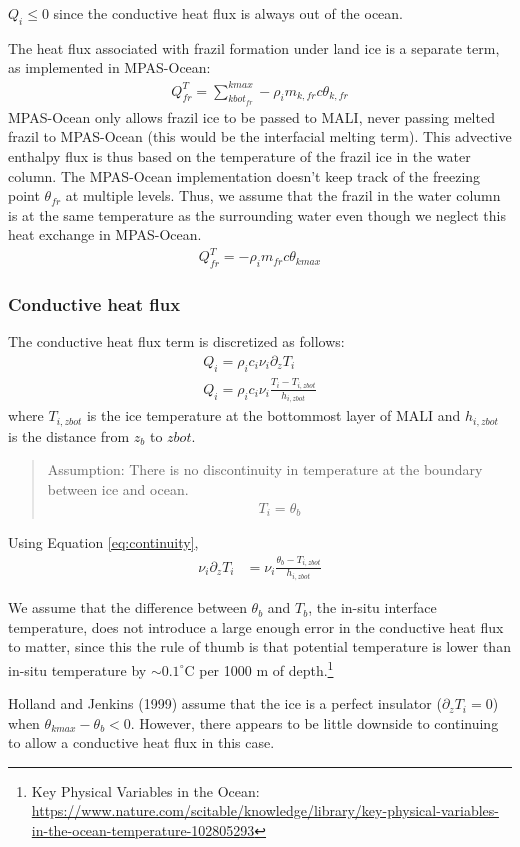 \documentclass[11pt]{report}
\newcommand{\bea}{\begin{eqnarray}}
\newcommand{\eea}{\end{eqnarray}}
\begin{document}
$Q_i \le 0$ since the conductive heat flux is always out of the ocean.

The heat flux associated with frazil formation under land ice is a separate term, as implemented in MPAS-Ocean:
\bea
    Q_{fr}^T = \sum_{kbot_{fr}}^{kmax} -\rho_i m_{k,fr} c \theta_{k,fr}
\eea
MPAS-Ocean only allows frazil ice to be passed to MALI, never passing melted frazil to MPAS-Ocean (this would be the interfacial melting term). This advective enthalpy flux is thus based on the temperature of the frazil ice in the water column. The MPAS-Ocean implementation doesn't keep track of the freezing point $\theta_{fr}$ at multiple levels. Thus, we assume that the frazil in the water column is at the same temperature as the surrounding water even though we neglect this heat exchange in MPAS-Ocean.
\bea
    Q_{fr}^T = -\rho_i m_{fr} c \theta_{kmax}
\eea

\subsubsection{Conductive heat flux}

The conductive heat flux term is discretized as follows:
\bea
    Q_i = \rho_i c_i \nu_i \partial_z T_i\\
    Q_i = \rho_i c_i \nu_i \frac{T_i - T_{i,zbot}}{h_{i,zbot}}
\eea
where $T_{i,zbot}$ is the ice temperature at the bottommost layer of MALI and $h_{i,zbot}$ is the distance from $z_b$ to $zbot$.

\begin{quote}
    Assumption: There is no discontinuity in temperature at the boundary between ice and ocean.
    \bea
        T_i = \theta_b \label{eq:continuity}
    \eea
\end{quote}

Using Equation \ref{eq:continuity},
\bea
    \nu_i \partial_z T_i &=\nu_i \frac{\theta_b - T_{i,zbot}}{h_{i,zbot}}\label{eq:conduct}
\eea

We assume that the difference between $\theta_b$ and $T_b$, the in-situ interface temperature, does not introduce a large enough error in the conductive heat flux to matter, since this the rule of thumb is that potential temperature is lower than in-situ temperature by $\sim 0.1^\circ$C per 1000 m of depth.\footnote{Key Physical Variables in the Ocean: \url{https://www.nature.com/scitable/knowledge/library/key-physical-variables-in-the-ocean-temperature-102805293}}

Holland and Jenkins (1999) assume that the ice is a perfect insulator ($\partial_z T_i = 0$) when $\theta_{kmax} - \theta_b < 0$. However, there appears to be little downside to continuing to allow a conductive heat flux in this case.
\end{document}
